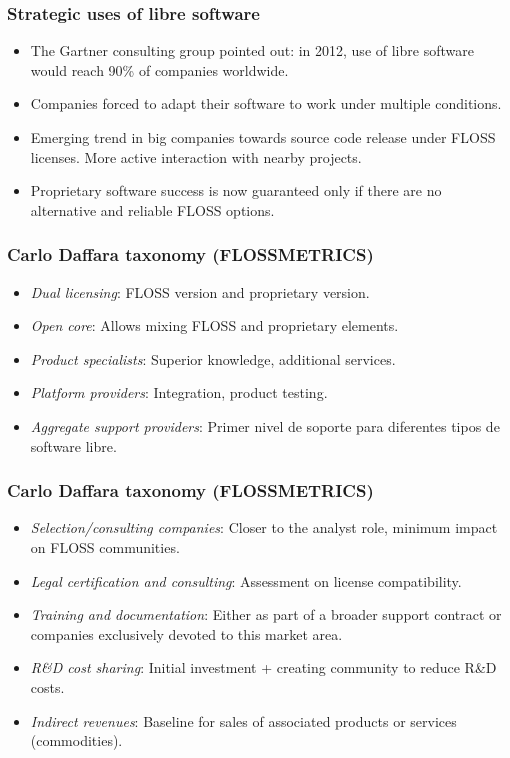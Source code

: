 \begin{frame}
 \frametitle{Strategic uses of libre software}
 \begin{itemize}
  \item The Gartner consulting group pointed out: in 2012, use of libre software would reach 90\% of companies worldwide.
  \item Companies forced to adapt their software to work under multiple conditions.
  \item Emerging trend in big companies towards source code release under FLOSS licenses.
More active interaction with nearby projects.
  \item Proprietary software success is now guaranteed only if there are no alternative and reliable FLOSS options.
 \end{itemize}
\end{frame}


\begin{frame}
 \frametitle{Carlo Daffara taxonomy (FLOSSMETRICS)}
 \begin{itemize}
  \item \textit{Dual licensing}: FLOSS version and proprietary version.
  \item \textit{Open core}: Allows mixing FLOSS and proprietary elements.
  \item \textit{Product specialists}: Superior knowledge, additional services.
  \item \textit{Platform providers}: Integration, product testing.
  \item \textit{Aggregate support providers}: Primer nivel de soporte para diferentes
tipos de software libre.
  \end{itemize}
  \end{frame}
  
\begin{frame}
 \frametitle{Carlo Daffara taxonomy (FLOSSMETRICS)}
 \begin{itemize}
\item \textit{Selection/consulting companies}: Closer to the analyst role, minimum impact on FLOSS communities.
  \item \textit{Legal certification and consulting}: Assessment on license compatibility.
  \item \textit{Training and documentation}: Either as part of a broader support contract or companies exclusively devoted
to this market area.
  \item \textit{R\&D cost sharing}: Initial investment + creating community to reduce R\&D costs.
  \item \textit{Indirect revenues}: Baseline for sales of associated products or services (commodities).
 \end{itemize}
\end{frame}

